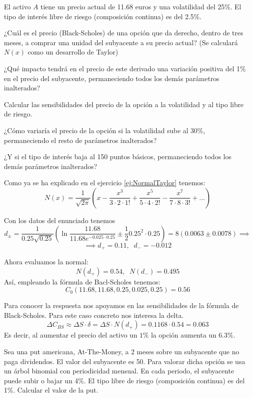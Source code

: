 \begin{problem}[3]
El activo $A$ tiene un precio actual de 11.68 euros y una volatilidad del 25\%. El tipo de interés libre de riesgo (composición continua) es del 2.5\%.

\ppart ¿Cuál es el precio (Black-Scholes) de una opción que da derecho, dentro de tres meses, a comprar una unidad del subyacente a su precio actual? (Se calculará $N(x)$ como un desarrollo de Taylor)

\ppart ¿Qué impacto tendrá en el precio de este derivado una variación positiva del 1\% en el precio del subyacente, permaneciendo todos los demás parámetros inalterados?

\ppart Calcular las sensibilidades del precio de la opción a la volatilidad y al tipo libre de riesgo.

\ppart ¿Cómo variaría el precio de la opción si la volatilidad sube al 30\%, permaneciendo el resto de parámetros inalterados?

\ppart ¿Y si el tipo de interés baja al 150 puntos básicos, permaneciendo todos los demás parámetros inalterados?

\solution


\spart

Como ya se ha explicado en el ejercicio \ref{ej:NormalTaylor} tenemos:
\[N(x) = \frac{1}{\sqrt{2π}}\left(x-\frac{x^3}{3 \cdot 2 \cdot 1!} +\frac{x^5}{5 \cdot 4 \cdot 2!} - \frac{x^7}{7\cdot 8 \cdot 3!}+...\right)\]

Con los datos del enunciado tenemos
\[d_{\pm} = \frac{1}{0.25\sqrt{0.25}}\left(\ln \frac{11.68}{11.68e^{-0.025\cdot 0.25}}\pm\frac{1}{2}0.25^2 \cdot 0.25\right)=8 \left(0.0063 \pm 0.0078\right) \implies\]
\[\implies d_+ = 0.11, \;\; d_-=-0.012 \]

Ahora evaluamos la normal:
\[N(d_+)=0.54, \;\; N(d_-)=0.495\]
Así, empleando la fórmula de Bacl-Scholes tenemos:
\[C_0(11.68,11.68,0.25,0.025,0.25)=0.56\]

\spart

Para conocer la respuesta nos apoyamos en las sensibilidades de la fórmula de Black-Scholes. Para este caso concreto nos interesa la delta.
\[ΔC_{BS} \approx ΔS\cdot δ = ΔS \cdot N(d_+) = 0.1168 \cdot 0.54 = 0.063\]
Es decir, al aumentar el precio del activo un $1\%$ la opción aumenta un $6.3\%$.
\end{problem}

\begin{problem}[4]
Sea una put americana, At-The-Money, a 2 meses sobre un subyacente que no paga dividendos. El valor del subyacente es 50. Para valorar dicha opción se usa un árbol binomial con periodicidad mensual. En cada periodo, el subyacente puede subir o bajar un 4\%. El tipo libre de riesgo (composición continua) es del 1\%. Calcular el valor de la put.
\solution

\end{problem}

